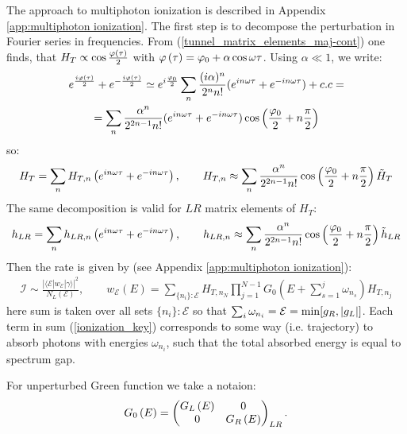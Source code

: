 The approach to multiphoton ionization is described in Appendix \ref{app:multiphoton ionization}.  The first step is to decompose the  perturbation in Fourier series in frequencies. From  (\ref{tunnel_matrix_elements_maj-cont}) one finds, that $ H_T\propto\cos\frac{\varphi\left(\tau\right)}{2} $ with $ \varphi\left(\tau\right)=\varphi_{0}+\alpha\cos\omega \tau $. Using $ \alpha\ll1 $, we write:
\begin{multline}
	e^{\frac{i\varphi\left(\tau\right)}{2}}+e^{-\frac{i\varphi\left(\tau\right)}{2}}\simeq e^{i\frac{\varphi_{0}}{2}}\sum_{n}\frac{(i\alpha)^{n}}{2^{n}n!}(e^{in\omega \tau}+e^{-in\omega \tau})+c.c=
	\\
	=\sum_{n}\frac{\alpha{}^{n}}{2^{2n-1}n!}(e^{in\omega \tau}+e^{-in\omega \tau})\cos\left(\frac{\varphi_{0}}{2}+n\frac{\pi}{2}\right)
\end{multline}
so:
\begin{gather}
\label{tunnel_hamiltonian_harmonics}
	H_{T}=
	\sum_n
	H_{T,n}
	\left(
	e^{in\omega\tau }
	+
	e^{-in\omega\tau }
	\right),
	\qquad
	H_{T,n}
	\approx
	\sum_{n}	
	\frac
	{\alpha^{n}}
	{2^{2n-1}n!}
	\cos\left(\frac{\varphi_{0}}{2}+n\frac{\pi}{2}\right)
	\tilde{H}_{T}
\end{gather}
The same decomposition is valid for $ LR $ matrix elements of $ H_T $:
\begin{gather}
h_{LR}=
\sum_n
h_{LR,n}
\left(
	e^{in\omega\tau }
	+
	e^{-in\omega\tau }
\right),
\qquad
h_{LR,n}
\approx
\sum_{n}	
\frac
{\alpha^{n}}
{2^{2n-1}n!}
\cos\left(\frac{\varphi_{0}}{2}+n\frac{\pi}{2}\right)
\tilde{h}_{LR}
\end{gather}
Then the rate is given by (see Appendix \ref{app:multiphoton ionization}):
\begin{gather}
\label{ionization_key}
\mathcal{I}
\sim
\frac{|\langle\mathcal{E}|w_{\mathcal{E}}|\gamma\rangle|^{2}}{N_L(\mathcal{E})},
\qquad
w_{\mathcal{E}}(E)
=
\sum_{\{n_{i}\}:\mathcal{E}}H_{T,n_{N}}\prod_{j=1}^{N-1}G_{0}\left(E+\sum_{s=1}^{j}\omega_{n_{s}}\right)H_{T,n_{j}}
\end{gather}
here sum is taken over all sets $ \{n_i\}:\mathcal{E} $ so that $ \sum_{i} \omega_{n_i}=\mathcal{E}=\min[g_R, \left|g_L\right|]$. Each term in sum (\ref{ionization_key}) corresponds to some way (i.e. trajectory) to absorb photons with energies $ \omega_{n_i} $, such that the total absorbed energy is equal to spectrum gap.

For unperturbed Green function we take a notaion:
\begin{gather}
	G_0\left(E\right)
	=
	\begin{pmatrix}
	G_L\left(E\right) & 0 \\
	0 & G_R\left(E\right)
	\end{pmatrix}_{LR}.
\end{gather}

